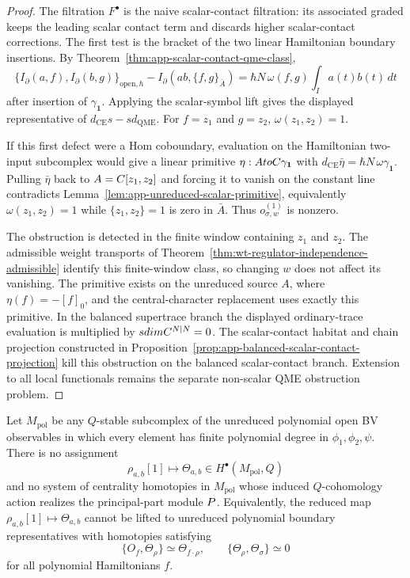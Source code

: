 \begin{proof}
  The filtration \(F^\bullet\) is the naive scalar-contact filtration:
  its associated graded keeps the leading scalar contact term and
  discards higher scalar-contact corrections.  The first test is the
  bracket of the two linear Hamiltonian boundary insertions.  By
  Theorem~\ref{thm:app-scalar-contact-qme-class},
  \[
    \{I_\partial(a,f),I_\partial(b,g)\}_{\mathrm{open},\hbar}
      -
    I_\partial(ab,\{f,g\}_{\bar A})
      =
    \hbar N\,\omega(f,g)\int_Ia(t)b(t)\,dt
  \]
  after insertion of \(\gamma_{\mathbf 1}\).  Applying the scalar-symbol
  lift gives the displayed representative of
  \(d_{\mathrm{CE}}s-sd_{\mathrm{QME}}\).  For \(f=z_1\) and \(g=z_2\),
  \(\omega(z_1,z_2)=1\).

  If this first defect were a Hom coboundary, evaluation on the
  Hamiltonian two-input subcomplex would give a linear primitive
  \(\eta:AtoC\gamma_{\mathbf 1}\) with
  \(d_{\mathrm{CE}}\bar\eta=\hbar N\,\omega\gamma_{\mathbf 1}\).  Pulling
  \(\bar\eta\) back to \(A=C[z_1,z_2]\) and forcing it to vanish on the
  constant line contradicts
  Lemma~\ref{lem:app-unreduced-scalar-primitive}, equivalently
  \(\omega(z_1,z_2)=1\) while \(\{z_1,z_2\}=1\) is zero in \(\bar A\).
  Thus \(o_{\sigma,w}^{(1)}\) is nonzero.

  The obstruction is detected in the finite window containing \(z_1\) and
  \(z_2\).  The admissible weight transports of
  Theorem~\ref{thm:wt-regulator-independence-admissible} identify this
  finite-window class, so changing \(w\) does not affect its vanishing.
  The primitive exists on the unreduced source \(A\), where
  \(\eta(f)=-[f]_0\), and the central-character replacement uses exactly
  this primitive.  In the balanced supertrace branch the displayed
  ordinary-trace evaluation is multiplied by
  \(sdimC^{N|N}=0\).  The scalar-contact habitat and
  chain projection constructed in
  Proposition~\ref{prop:app-balanced-scalar-contact-projection} kill this
  obstruction on the balanced scalar-contact branch.  Extension to all
  local functionals remains the separate non-scalar QME obstruction
  problem.
\end{proof}

\begin{thm}
\label{thm:app-unreduced-polynomial-centrality-no-go}
  Let \(M_{\mathrm{pol}}\) be any \(Q\)-stable subcomplex of the
  unreduced polynomial open BV observables in which every element has
  finite polynomial degree in \(\phi_1,\phi_2,\psi\).  There is no
  assignment
  \[
    \rho_{a,b}[1]\longmapsto \Theta_{a,b}\in H^\bullet(M_{\mathrm{pol}},Q)
  \]
  and no system of centrality homotopies in \(M_{\mathrm{pol}}\) whose
  induced \(Q\)-cohomology action realizes the principal-part module
  \(P\).  Equivalently, the reduced map
  \(\rho_{a,b}[1]\mapsto\Theta_{a,b}\) cannot be lifted to unreduced
  polynomial boundary representatives with homotopies satisfying
  \[
    \{O_f,\Theta_\rho\}\simeq\Theta_{f\cdot\rho},
    \qquad
    \{\Theta_\rho,\Theta_\sigma\}\simeq0
  \]
  for all polynomial Hamiltonians \(f\).
\end{thm}

